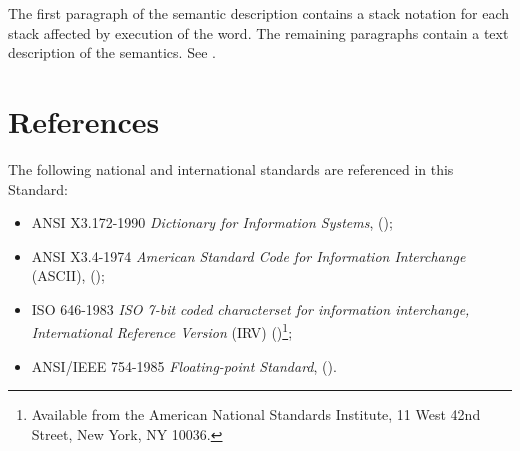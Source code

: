 The first paragraph of the semantic description contains a stack
notation for each stack affected by execution of the word. The
remaining paragraphs contain a text description of the semantics.
See .

\section{References}

The following national and international standards are referenced
in this Standard:

\begin{itemize}
\item ANSI X3.172-1990 \textit{Dictionary for Information Systems},
	();

\item ANSI X3.4-1974 \textit{American Standard Code for Information
	Interchange} (ASCII),
	();

\item ISO 646-1983 \textit{ISO 7-bit coded characterset for
	information interchange, International Reference Version} (IRV)
	()\footnote{Available from
	the American National Standards Institute, 11 West 42nd Street,
	New York, NY 10036.};

\item ANSI/IEEE 754-1985 \textit{Floating-point Standard},
	().
\end{itemize}
